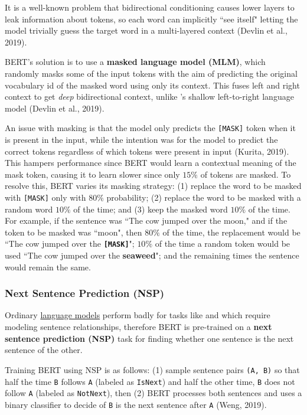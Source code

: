 It is a well-known problem that bidirectional conditioning causes lower layers to leak information about tokens, so each word can implicitly ``see itself" letting the model trivially guess the target word in a multi-layered context (Devlin et al., 2019).  

BERT's solution is to use a \textbf{masked language model (MLM)}, which randomly masks some of the input tokens with the aim of predicting the original vocabulary id of the masked word using only its context. This fuses left and right context to get \emph{deep} bidirectional context, unlike 's shallow left-to-right language model (Devlin et al., 2019).  

An issue with masking is that the model only predicts the \texttt{[MASK]} token when it is present in the input, while the intention was for the model to predict the correct tokens regardless of which tokens were present in input (Kurita, 2019). This hampers performance since BERT would learn a contextual meaning of the mask token, causing it to learn slower since only $15 \%$ of tokens are masked. To resolve this, BERT varies its masking strategy: (1) replace the word to be masked with \texttt{[MASK]} only with $80\%$ probability; (2) replace the word to be masked with a random word $10 \%$ of the time; and (3) keep the masked word $10 \%$ of the time. For example, if the sentence was ``The cow jumped over the moon," and if the token to be masked was ``moon", then $80 \%$ of the time, the replacement would be ``The cow jumped over the \textbf{\texttt{[MASK]}}"; $10 \%$ of the time a random token would be used ``The cow jumped over the \textbf{seaweed}"; and the remaining times the sentence would remain the same. 



\subsubsection{Next Sentence Prediction (NSP)} \label{sec:nextsentencepredictionNSP}

Ordinary \hyperref[sec:LanguageModels]{language models} perform badly for tasks like  and  which require modeling sentence relationships, therefore BERT is pre-trained on a \textbf{next sentence prediction (NSP)} task for finding whether one sentence is the next sentence of the other. 

Training BERT using NSP is as follows: (1) sample sentence pairs \texttt{(A, B)} so that half the time \texttt{B} follows \texttt{A} (labeled as \texttt{IsNext}) and half the other time, \texttt{B} does not follow \texttt{A} (labeled as \texttt{NotNext}), then (2) BERT processes both sentences and uses a binary classifier to decide of \texttt{B} is the next sentence after \texttt{A} (Weng, 2019). 

